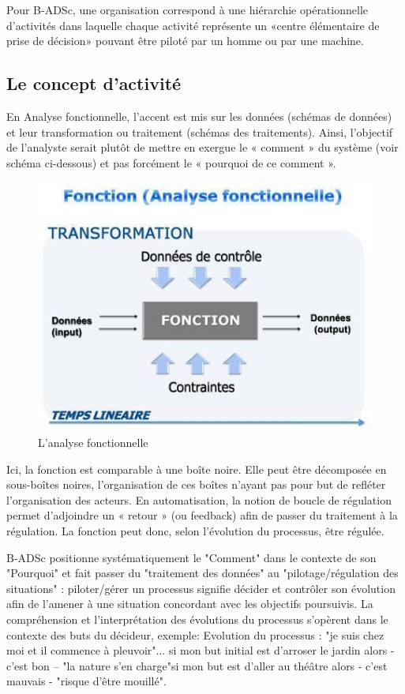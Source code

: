 Pour B-ADSc, une organisation correspond à une hiérarchie opérationnelle d’activités dans laquelle chaque activité représente un «centre élémentaire de prise de décision» pouvant être piloté par un homme ou par une machine.\cite{badsc}


\subsection{ Le concept d’activité}

En Analyse fonctionnelle, l’accent est mis sur les données (schémas de données) et leur transformation ou traitement (schémas des traitements). Ainsi, l’objectif de l’analyste serait plutôt de mettre en exergue le « comment » du système (voir schéma ci-dessous) et pas forcément le « pourquoi de ce comment ».

\begin{figure}[H]
\begin{center}
\includegraphics[width=0.5\linewidth]{images/analyse_fonctionnelle}
\end{center}
\caption{L'analyse fonctionnelle}
\label{fig:9}
\end{figure}

Ici, la fonction est comparable à une boîte noire. Elle peut être décomposée en sous-boîtes noires, l'organisation de ces boîtes n'ayant pas pour but de refléter l'organisation des acteurs. En automatisation, la notion de boucle de régulation permet d’adjoindre un « retour » (ou feedback) afin de passer du traitement à la régulation. La fonction peut donc, selon l’évolution du processus, être régulée.

B-ADSc positionne systématiquement le "Comment" dans le contexte de son "Pourquoi" et fait passer du "traitement des données" au "pilotage/régulation des situations" : piloter/gérer un processus signifie décider et contrôler son évolution afin de l’amener à une situation concordant avec les objectifs poursuivis.
La compréhension et l'interprétation des évolutions du processus s’opèrent dans le contexte des buts du décideur, exemple:
Evolution du processus : "je suis chez moi et il commence à pleuvoir"...
si mon but initial est d’arroser le jardin alors - c’est bon – "la nature s’en charge"si mon but est d’aller au théâtre alors - c’est mauvais - "risque d’être mouillé".


